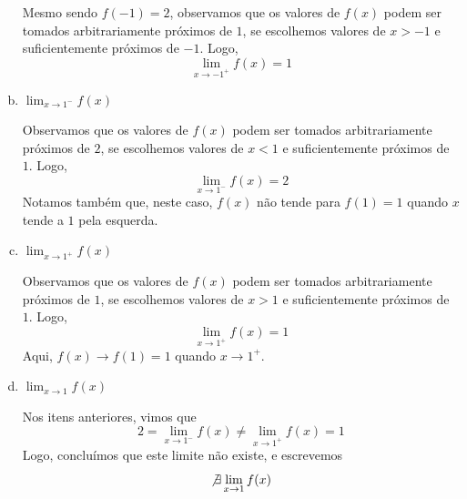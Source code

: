 \cleardoublepage\documentclass[../main.tex]{subfiles}
\begin{document}
\begin{exeresol}
\begin{resol}
\begin{enumerate}[a)]
    Mesmo sendo $f(-1)=2$, observamos que os valores de $f(x)$ podem ser tomados arbitrariamente próximos de $1$, se escolhemos valores de $x>-1$ e suficientemente próximos de $-1$. Logo,
    \begin{equation*}
      \lim_{x\to -1^+} f(x) = 1
    \end{equation*}

  \item $\displaystyle \lim_{x\to 1^-} f(x)$

    Observamos que os valores de $f(x)$ podem ser tomados arbitrariamente próximos de $2$, se escolhemos valores de $x<1$ e suficientemente próximos de $1$. Logo,
    \begin{equation*}
      \lim_{x\to 1^-} f(x) = 2
    \end{equation*}
    Notamos também que, neste caso, $f(x)$ não tende para $f(1)=1$ quando $x$ tende a $1$ pela esquerda.

  \item $\displaystyle \lim_{x\to 1^+} f(x)$

    Observamos que os valores de $f(x)$ podem ser tomados arbitrariamente próximos de $1$, se escolhemos valores de $x>1$ e suficientemente próximos de $1$. Logo,
    \begin{equation*}
      \lim_{x\to 1^+} f(x) = 1
    \end{equation*}
    Aqui, $f(x)\to f(1)=1$ quando $x\to 1^+$.

    \item $\displaystyle \lim_{x\to 1} f(x)$

      Nos itens anteriores, vimos que
      \begin{equation*}
        2 = \lim_{x\to 1^-} f(x) \neq \lim_{x\to 1^+} f(x) = 1
      \end{equation*}
      Logo, concluímos que este limite não existe, e escrevemos
      \begin{equation*}
        \not\exists\lim_{x\to 1} f(x)
      \end{equation*}
  \end{enumerate}
\end{resol}
\end{exeresol}
\end{document}
